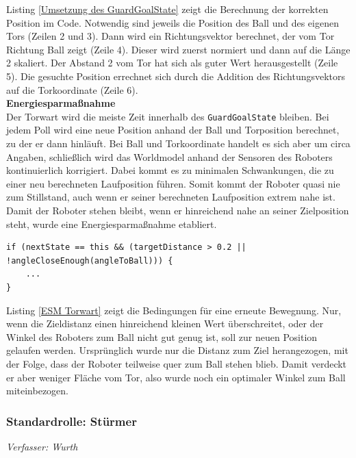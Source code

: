 \documentclass[fontsize=12pt,a4paper,final]{scrartcl}[2003/01/01]
\begin{document}
Listing \ref{Umsetzung des GuardGoalState} zeigt die Berechnung der korrekten Position im Code. Notwendig sind jeweils die Position des Ball und des eigenen Tors (Zeilen 2 und 3). Dann wird ein Richtungsvektor berechnet, der vom Tor Richtung Ball zeigt (Zeile 4). Dieser wird zuerst normiert und dann auf die Länge 2 skaliert. Der Abstand 2 vom Tor hat sich als guter Wert herausgestellt (Zeile 5). Die gesuchte Position errechnet sich durch die Addition des Richtungsvektors auf die Torkoordinate (Zeile 6).
\\

\textbf{Energiesparmaßnahme}
\\
Der Torwart wird die meiste Zeit innerhalb des \lstinline$GuardGoalState$ bleiben. Bei jedem Poll wird eine neue Position anhand der Ball und Torposition berechnet, zu der er dann hinläuft. Bei Ball und Torkoordinate handelt es sich aber um circa Angaben, schließlich wird das Worldmodel anhand der Sensoren des Roboters kontinuierlich korrigiert. Dabei kommt es zu minimalen Schwankungen, die zu einer neu berechneten Laufposition führen. Somit kommt der Roboter quasi nie zum Stillstand, auch wenn er seiner berechneten Laufposition extrem nahe ist. Damit der Roboter stehen bleibt, wenn er hinreichend nahe an seiner Zielposition steht, wurde eine Energiesparmaßnahme etabliert.
\\

\begin{lstlisting}[caption=Energiesparmaßnahme Torwart, captionpos=b, label= ESM Torwart]
if (nextState == this && (targetDistance > 0.2 || !angleCloseEnough(angleToBall))) {
	...
} 

\end{lstlisting}

Listing \ref{ESM Torwart} zeigt die Bedingungen für eine erneute Bewegnung. Nur, wenn die Zieldistanz einen hinreichend kleinen Wert überschreitet, oder der Winkel des Roboters zum Ball nicht gut genug ist, soll zur neuen Position gelaufen werden. Ursprünglich wurde nur die Distanz zum Ziel herangezogen, mit der Folge, dass der Roboter teilweise quer zum Ball stehen blieb. Damit verdeckt er aber weniger Fläche vom Tor, also wurde noch ein optimaler Winkel zum Ball miteinbezogen.
\subsubsection{Standardrolle: Stürmer}
\textit{Verfasser: Wurth}\\
\end{document}
